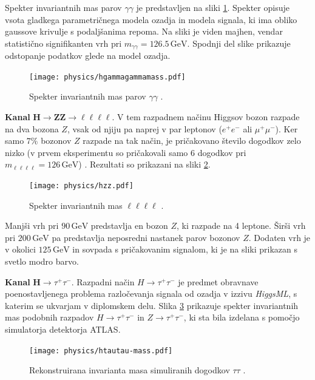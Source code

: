 \documentclass[11pt,a4paper,openany]{book}
\begin{document}
Spekter invariantnih mas parov $\gamma\gamma$ je predstavljen na sliki \ref{sl:hgammagamma}. Spekter opisuje vsota gladkega parametričnega modela ozadja in modela signala, ki ima obliko gaussove krivulje s podaljšanima repoma. Na sliki je viden majhen, vendar statistično signifikanten vrh pri $m_{\gamma\gamma} = \num{126,5}\,\text{GeV}$. Spodnji del slike prikazuje odstopanje podatkov glede na model ozadja.

\begin{figure}[ht]
	\centering
	\texttt{[image: physics/hgammagammamass.pdf]}
	
	\caption{ Spekter invariantnih mas parov $\gamma\gamma$ \cite{AadScience2012}. }
	\label{sl:hgammagamma}
\end{figure}


\textbf{Kanal} $\mathbf{H \rightarrow ZZ \rightarrow \ell\ell\ell\ell}$. V tem razpadnem načinu Higgsov bozon razpade na dva bozona $Z$, vsak od njiju pa naprej v par leptonov ($e^+e^-$ ali $\mu^+\mu^-$). Ker samo $7\%$ bozonov $Z$ razpade na tak način, je pričakovano število dogodkov zelo nizko (v prvem eksperimentu so pričakovali samo 6 dogodkov pri $m_{\ell\ell\ell\ell} = 126\,\text{GeV}$) \cite{AadScience2012}. Rezultati so prikazani na sliki \ref{sl:hzz}.

\begin{figure}[ht]
	\centering
	\texttt{[image: physics/hzz.pdf]}
	
	\caption{ Spekter invariantnih mas $\ell\ell\ell\ell$ \cite{AadScience2012}. }
	\label{sl:hzz}
\end{figure}

Manjši vrh pri $90\,\text{GeV}$ predstavlja en bozon $Z$, ki razpade na 4 leptone. Širši vrh pri $200\,\text{GeV}$ pa predstavlja neposredni nastanek parov bozonov $Z$. Dodaten vrh je v okolici $125\,\text{GeV}$ in sovpada s pričakovanim signalom, ki je na sliki prikazan s svetlo modro barvo.


\textbf{Kanal} ${\mathbf H \rightarrow \tau^+\tau^-}$. Razpadni način $H \rightarrow \tau^+\tau^-$ je predmet obravnave poenostavljenega problema razločevanja signala od ozadja v izzivu \textit{HiggsML}, s katerim se ukvarjam v diplomskem delu. Slika \ref{sl:htautaumass} prikazuje spekter invariantnih mas podobnih razpadov $H \rightarrow \tau^+\tau^-$ in $Z \rightarrow \tau^+\tau^-$, ki sta bila izdelana s pomočjo simulatorja detektorja ATLAS. 

\begin{figure}[ht]
	\centering
	\texttt{[image: physics/htautau-mass.pdf]}
	
	\caption{ Rekonstruirana invarianta masa simuliranih dogodkov $\tau\tau$ \cite{atlas2013}. }
	\label{sl:htautaumass}
\end{figure}
\end{document}

